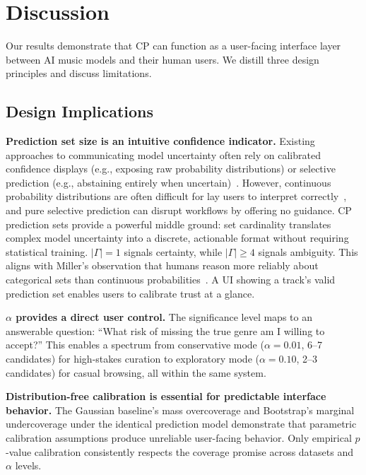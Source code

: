 
\section{Discussion}
\label{sec:discussion}

Our results demonstrate that CP can function as a user-facing interface layer
between AI music models and their human users. We distill three design
principles and discuss limitations.

\subsection{Design Implications}

\textbf{Prediction set size is an intuitive confidence indicator.} 
Existing approaches to communicating model uncertainty often rely on calibrated confidence displays (e.g., exposing raw probability distributions) or selective prediction (e.g., abstaining entirely when uncertain)~\cite{bhatt2021uncertainty,geifman2017selective}. However, continuous probability distributions are often difficult for lay users to interpret correctly~\cite{padilla2021uncertainty}, and pure selective prediction can disrupt workflows by offering no guidance. CP prediction sets provide a powerful middle ground: set cardinality translates complex model uncertainty into a discrete, actionable format without requiring statistical training. $|\Gamma| = 1$ signals certainty, while $|\Gamma| \ge 4$ signals ambiguity. This aligns with Miller's observation that humans reason more reliably about categorical sets than continuous probabilities~\cite{miller2019explanation}. A UI showing a track's valid prediction set enables users to calibrate trust at a glance.

\textbf{$\alpha$ provides a direct user control.} The significance level maps
to an answerable question: ``What risk of missing the true genre am I willing to
accept?'' This enables a spectrum from conservative mode ($\alpha = 0.01$, 6--7
candidates) for high-stakes curation to exploratory mode ($\alpha = 0.10$, 2--3
candidates) for casual browsing, all within the same system.

\textbf{Distribution-free calibration is essential for predictable interface
behavior.} The Gaussian baseline's mass overcoverage and Bootstrap's marginal
undercoverage under the identical prediction model demonstrate that parametric
calibration assumptions produce unreliable user-facing behavior. Only empirical
$p$-value calibration consistently respects the coverage promise across datasets
and $\alpha$ levels.

